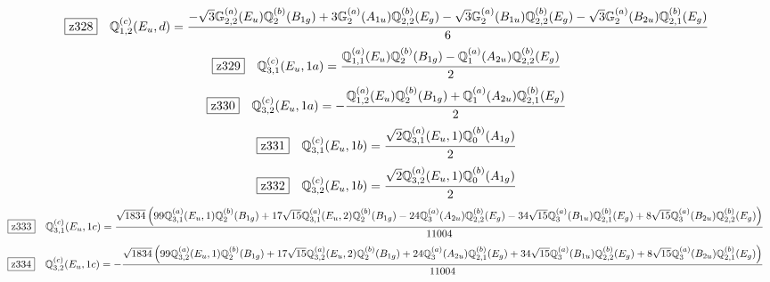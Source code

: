\documentclass[fleqn,10pt,landscape]{jsarticle}
\begin{document}
\begin{dmath*}
\hspace*{3mm}\fbox{z328}\quad \mathbb{Q}_{1,2}^{(c)}(E_{u},d)=\frac{- \sqrt{3} \mathbb{G}_{2,2}^{(a)}(E_{u}) \mathbb{Q}_{2}^{(b)}(B_{1g}) + 3 \mathbb{G}_{2}^{(a)}(A_{1u}) \mathbb{Q}_{2,2}^{(b)}(E_{g}) - \sqrt{3} \mathbb{G}_{2}^{(a)}(B_{1u}) \mathbb{Q}_{2,2}^{(b)}(E_{g}) - \sqrt{3} \mathbb{G}_{2}^{(a)}(B_{2u}) \mathbb{Q}_{2,1}^{(b)}(E_{g})}{6}
\end{dmath*}
\begin{dmath*}
\hspace*{3mm}\fbox{z329}\quad \mathbb{Q}_{3,1}^{(c)}(E_{u},1a)=\frac{\mathbb{Q}_{1,1}^{(a)}(E_{u}) \mathbb{Q}_{2}^{(b)}(B_{1g}) - \mathbb{Q}_{1}^{(a)}(A_{2u}) \mathbb{Q}_{2,2}^{(b)}(E_{g})}{2}
\end{dmath*}
\begin{dmath*}
\hspace*{3mm}\fbox{z330}\quad \mathbb{Q}_{3,2}^{(c)}(E_{u},1a)=- \frac{\mathbb{Q}_{1,2}^{(a)}(E_{u}) \mathbb{Q}_{2}^{(b)}(B_{1g}) + \mathbb{Q}_{1}^{(a)}(A_{2u}) \mathbb{Q}_{2,1}^{(b)}(E_{g})}{2}
\end{dmath*}
\begin{dmath*}
\hspace*{3mm}\fbox{z331}\quad \mathbb{Q}_{3,1}^{(c)}(E_{u},1b)=\frac{\sqrt{2} \mathbb{Q}_{3,1}^{(a)}(E_{u},1) \mathbb{Q}_{0}^{(b)}(A_{1g})}{2}
\end{dmath*}
\begin{dmath*}
\hspace*{3mm}\fbox{z332}\quad \mathbb{Q}_{3,2}^{(c)}(E_{u},1b)=\frac{\sqrt{2} \mathbb{Q}_{3,2}^{(a)}(E_{u},1) \mathbb{Q}_{0}^{(b)}(A_{1g})}{2}
\end{dmath*}
\begin{dmath*}
\hspace*{3mm}\fbox{z333}\quad \mathbb{Q}_{3,1}^{(c)}(E_{u},1c)=\frac{\sqrt{1834} \left(99 \mathbb{Q}_{3,1}^{(a)}(E_{u},1) \mathbb{Q}_{2}^{(b)}(B_{1g}) + 17 \sqrt{15} \mathbb{Q}_{3,1}^{(a)}(E_{u},2) \mathbb{Q}_{2}^{(b)}(B_{1g}) - 24 \mathbb{Q}_{3}^{(a)}(A_{2u}) \mathbb{Q}_{2,2}^{(b)}(E_{g}) - 34 \sqrt{15} \mathbb{Q}_{3}^{(a)}(B_{1u}) \mathbb{Q}_{2,1}^{(b)}(E_{g}) + 8 \sqrt{15} \mathbb{Q}_{3}^{(a)}(B_{2u}) \mathbb{Q}_{2,2}^{(b)}(E_{g})\right)}{11004}
\end{dmath*}
\begin{dmath*}
\hspace*{3mm}\fbox{z334}\quad \mathbb{Q}_{3,2}^{(c)}(E_{u},1c)=- \frac{\sqrt{1834} \left(99 \mathbb{Q}_{3,2}^{(a)}(E_{u},1) \mathbb{Q}_{2}^{(b)}(B_{1g}) + 17 \sqrt{15} \mathbb{Q}_{3,2}^{(a)}(E_{u},2) \mathbb{Q}_{2}^{(b)}(B_{1g}) + 24 \mathbb{Q}_{3}^{(a)}(A_{2u}) \mathbb{Q}_{2,1}^{(b)}(E_{g}) + 34 \sqrt{15} \mathbb{Q}_{3}^{(a)}(B_{1u}) \mathbb{Q}_{2,2}^{(b)}(E_{g}) + 8 \sqrt{15} \mathbb{Q}_{3}^{(a)}(B_{2u}) \mathbb{Q}_{2,1}^{(b)}(E_{g})\right)}{11004}
\end{dmath*}
\end{document}
